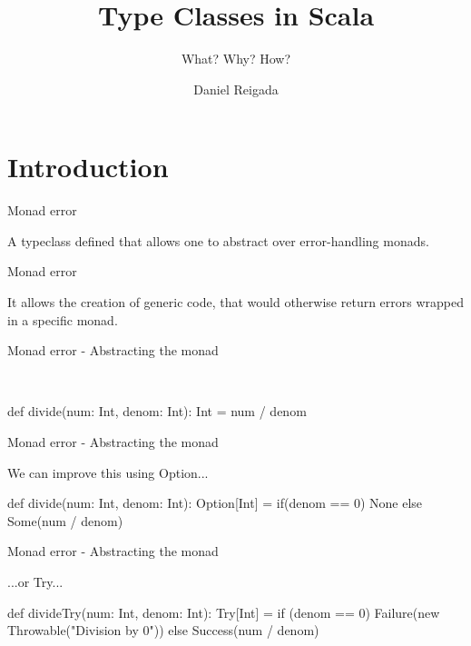 \documentclass[13pt]{beamer}
\title{Type Classes in Scala}
\subtitle{What? Why? How?}
\author{Daniel Reigada}
\institute{IST - Programming Languages}
\begin{document}
\maketitle

\section{Introduction}

\begin{frame}{Monad error}

  A typeclass defined that allows one to abstract over error-handling monads. \\


\end{frame}

\begin{frame}{Monad error}

  It allows the creation of generic code, that would otherwise return errors wrapped in a specific monad. \\

\end{frame}

\begin{frame}[fragile]{Monad error - Abstracting the monad}
  
   \\ 

  \begin{scalaCode}
    def divide(num: Int, denom: Int): Int = num / denom
  \end{scalaCode}

\end{frame}

\begin{frame}[fragile]{Monad error - Abstracting the monad}

  We can improve this using Option...

  \begin{scalaCode}
    def divide(num: Int, denom: Int): Option[Int] =
      if(denom == 0) None else Some(num / denom)
  \end{scalaCode}

\end{frame}

\begin{frame}[fragile]{Monad error - Abstracting the monad}

  ...or Try...

  \begin{scalaCode}
    def divideTry(num: Int, denom: Int): Try[Int] =
      if (denom == 0) Failure(new Throwable("Division by 0"))
      else Success(num / denom)
  \end{scalaCode}

\end{frame}
\end{document}
